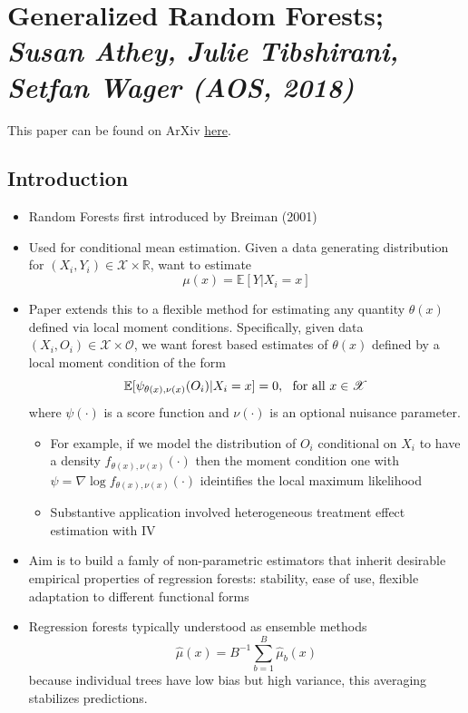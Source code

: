 
\section{Generalized Random Forests; \textit{\small Susan Athey, Julie Tibshirani, Setfan Wager (AOS, 2018)}}
This paper can be found on ArXiv \href{https://arxiv.org/pdf/1610.01271.pdf}{here}.
\subsection{Introduction}
\begin{itemize}
	\item Random Forests first introduced by Breiman (2001)
	\item Used for conditional mean estimation. Given a data generating distribution for $(X_i, Y_i) \in \mathscr{X}\times\mathbb{R}$, want to estimate 
	\begin{equation}
		\mu(x) = \mathbb{E}[Y| X_i = x]
	\end{equation}
	\item Paper extends this to a flexible method for estimating any quantity $\theta(x)$ defined via local moment conditions. Specifically, given data $(X_i, O_i) \in \mathscr{X}\times\mathscr{O}$, we want forest based estimates of $\theta(x)$ defined by a local moment condition of the form 
	\begin{equation}\label{MC1}
		\mathbb{E}[\psi_{\theta(x), \nu(x)}(O_i)|X_i = x] = 0, \hbox{ }\text{ for all }x\in \mathscr{X}
	\end{equation}
	where $\psi(\cdot)$ is a score function and $\nu(\cdot)$ is an optional nuisance parameter.
	\begin{itemize}
		\item For example, if we model the distribution of $O_i$ conditional on $X_i$ to have a density $f_{\theta(x), \nu(x)}(\cdot)$ then the moment condition one with $\psi = \nabla \log f_{\theta(x), \nu(x)}(\cdot)$ ideintifies the local maximum likelihood 
		\item Substantive application involved heterogeneous treatment effect estimation with IV
	\end{itemize}
	\item Aim is to build a famly of non-parametric estimators that inherit desirable empirical properties of regression forests: stability, ease of use, flexible adaptation to different functional forms
	\item Regression forests typically understood as ensemble methods
	\begin{equation*}
		\hat{\mu}(x) = B^{-1} \sum_{b= 1}^B \hat{\mu}_b(x)
	\end{equation*}
	because individual trees have low bias but high variance, this averaging stabilizes predictions. 


\end{itemize}
